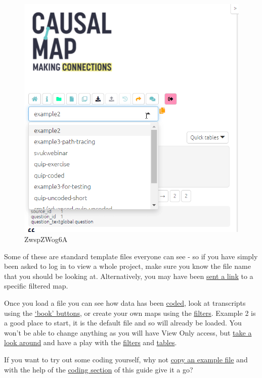 \documentclass[
]{book}
\begin{document}
\begin{figure}
\centering
\includegraphics[width=6.77083in,height=\textheight]{_assets/ZwspZWog6A.gif}
\caption{ZwspZWog6A}
\end{figure}

Some of these are standard template files everyone can see - so if you have simply been asked to log in to view a whole project, make sure you know the file name that you should be looking at. Alternatively, you may have been \protect\hyperlink{xinvite}{sent a link} to a specific filtered map.

Once you load a file you can see how data has been \protect\hyperlink{xcoding-panel}{coded}, look at transcripts using the \protect\hyperlink{xstatement-nav}{`book' buttons}, or create your own maps using the \href{xintro-filters}{filters}. Example 2 is a good place to start, it is the default file and so will already be loaded. You won't be able to change anything as you will have View Only access, but \protect\hyperlink{quick-tour}{take a look around} and have a play with the \protect\hyperlink{xintro-filters}{filters} and \href{x\#all-tables}{tables}.

If you want to try out some coding yourself, why not \protect\hyperlink{xown-copy}{copy an example file} and with the help of the \protect\hyperlink{xcoding-panel}{coding section} of this guide give it a go?
\end{document}
